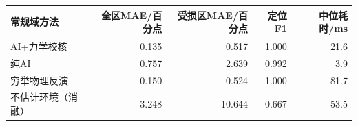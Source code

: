 \begin{tabular}{lrrrr}\toprule
常规域方法 & 全区MAE/百分点 & 受损区MAE/百分点 & 定位F1 & 中位耗时/ms\\\midrule
AI+力学校核 & 0.135 & 0.517 & 1.000 & 21.6 \\
纯AI & 0.757 & 2.639 & 0.992 & 3.9 \\
穷举物理反演 & 0.150 & 0.524 & 1.000 & 81.7 \\
不估计环境（消融） & 3.248 & 10.644 & 0.667 & 53.5 \\
\bottomrule\end{tabular}
